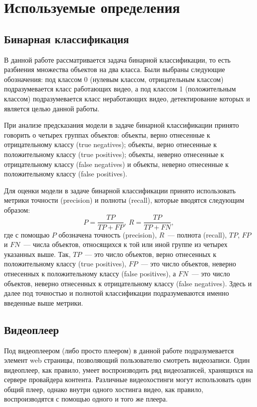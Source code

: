 \chapter{Используемые определения}

\section{Бинарная классификация}

В данной работе рассматривается задача бинарной классификации, то есть разбиения множества объектов на два класса. Были выбраны следующие обозначения: под классом 0 (нулевым классом, отрицательным классом) подразумевается класс работающих видео, а под классом 1 (положительным классом) подразумевается класс неработающих видео, детектирование которых и является целью данной работы.

При анализе предсказания модели в задаче бинарной классификации принято говорить о четырех группах объектов: объекты, верно отнесенные к отрицательному классу (true negatives); объекты, верно отнесенные к положительному классу (true positives); объекты, неверно отнесенные к отрицательному классу (false negatives) и объекты, неверно отнесенные к положительному классу (false positives).

Для оценки модели в задаче бинарной классификации принято использовать метрики точности (precision) и полноты (recall), которые вводятся следующим образом:
\[
    P = \frac{TP}{TP + FP},\ R = \frac{TP}{TP + FN},
\]
где с помощью $P$ обозначена точность (precision), $R$~--- полнота (recall), $TP$, $FP$ и $FN$~--- числа объектов, относящихся к той или иной группе из четырех указанных выше. Так, $TP$~--- это число объектов, верно отнесенных к положительному классу (true positives), $FP$~--- это число объектов, неверно отнесенных к положительному классу (false positives), а $FN$~--- это число объектов, неверно отнесенных к отрицательному классу (false negatives). Здесь и далее под точностью и полнотой классификации подразумеваются именно введенные выше метрики.

\section{Видеоплеер}

Под видеоплеером (либо просто плеером) в данной работе подразумевается элемент web страницы, позволяющий пользователю смотреть видеозаписи. Один видеоплеер, как правило, умеет воспроизводить ряд видеозаписей, хранящихся на сервере провайдера контента. Различные видеохостинги могут использовать один общий плеер, однако внутри одного хостинга видео, как правило, воспроизводятся с помощью одного и того же плеера.

